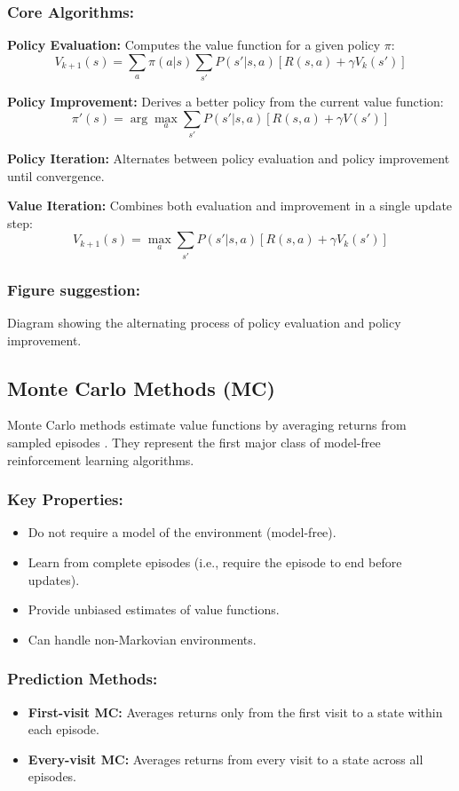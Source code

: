 \documentclass[../Main.tex]{subfiles}
\begin{document}
\subsubsection{Core Algorithms:}

\textbf{Policy Evaluation:} Computes the value function for a given policy $\pi$:
\[
V_{k+1}(s) = \sum_a \pi(a|s) \sum_{s'} P(s'|s,a)[R(s,a) + \gamma V_k(s')]
\]

\textbf{Policy Improvement:} Derives a better policy from the current value function:
\[
\pi'(s) = \arg\max_a \sum_{s'} P(s'|s,a)[R(s,a) + \gamma V(s')]
\]

\textbf{Policy Iteration:} Alternates between policy evaluation and policy improvement until convergence.

\textbf{Value Iteration:} Combines both evaluation and improvement in a single update step:
\[
V_{k+1}(s) = \max_a \sum_{s'} P(s'|s,a)[R(s,a) + \gamma V_k(s')]
\]

\subsubsection{Figure suggestion:} Diagram showing the alternating process of policy evaluation and policy improvement.

\subsection{Monte Carlo Methods (MC)}

Monte Carlo methods estimate value functions by averaging returns from sampled episodes \cite{sutton2018reinforcement}. They represent the first major class of model-free reinforcement learning algorithms.

\subsubsection{Key Properties:}
\begin{itemize}
    \item Do not require a model of the environment (model-free).
    \item Learn from complete episodes (i.e., require the episode to end before updates).
    \item Provide unbiased estimates of value functions.
    \item Can handle non-Markovian environments.
\end{itemize}

\subsubsection{Prediction Methods:}
\begin{itemize}
    \item \textbf{First-visit MC:} Averages returns only from the first visit to a state within each episode.
    \item \textbf{Every-visit MC:} Averages returns from every visit to a state across all episodes.
\end{itemize}
\end{document}
